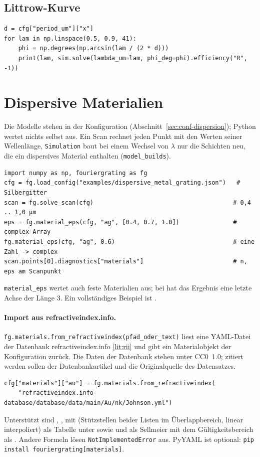 \subsection{Littrow-Kurve}
\begin{lstlisting}[style=py]
d = cfg["period_um"]["x"]
for lam in np.linspace(0.5, 0.9, 41):
    phi = np.degrees(np.arcsin(lam / (2 * d)))
    print(lam, sim.solve(lambda_um=lam, phi_deg=phi).efficiency("R", -1))
\end{lstlisting}

\section{Dispersive Materialien}\label{sec:py-dispersion}
%
Die Modelle stehen in der Konfiguration (Abschnitt~\ref{sec:conf-dispersion}); Python wertet nichts selbst aus. Ein
Scan rechnet jeden Punkt mit den Werten seiner Wellenlänge, \texttt{Simulation} baut bei einem Wechsel von
$\lambda$ nur die Schichten neu, die ein dispersives Material enthalten (\texttt{model\_builds}).
\begin{lstlisting}[style=py]
import numpy as np, fouriergrating as fg
cfg = fg.load_config("examples/dispersive_metal_grating.json")   # Silbergitter
scan = fg.solve_scan(cfg)                                       # 0,4 .. 1,0 µm
eps = fg.material_eps(cfg, "ag", [0.4, 0.7, 1.0])               # complex-Array
fg.material_eps(cfg, "ag", 0.6)                                 # eine Zahl -> complex
scan.points[0].diagnostics["materials"]                         # n, eps am Scanpunkt
\end{lstlisting}
\texttt{material\_eps} wertet auch feste Materialien aus; bei  hat das Ergebnis eine letzte
Achse der Länge 3. Ein vollständiges Beispiel ist .

\paragraph{Import aus refractiveindex.info.} \texttt{fg.materials.from\_refractiveindex(pfad\_oder\_text)} liest eine
YAML-Datei der Datenbank refractiveindex.info \ref{lit:rii} und gibt ein Materialobjekt der Konfiguration zurück.
Die Daten der Datenbank stehen unter CC0~1.0; zitiert werden sollen der Datenbankartikel und die Originalquelle
des Datensatzes.
\begin{lstlisting}[style=py]
cfg["materials"]["au"] = fg.materials.from_refractiveindex(
    "refractiveindex.info-database/database/data/main/Au/nk/Johnson.yml")
\end{lstlisting}
Unterstützt sind , ,  mit  (Stützstellen beider
Listen im Überlappbereich, linear interpoliert) als Tabelle unter  sowie  und 
als Sellmeier mit dem Gültigkeitsbereich als . Andere Formeln lösen \texttt{NotImplementedError} aus.
PyYAML ist optional: \texttt{pip install fouriergrating[materials]}.


